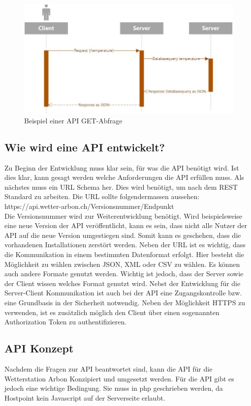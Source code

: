 \begin{figure}[h!]
	\centering
	\includegraphics[width=1\linewidth]{img/Sequenzdiagramm_API}
	\caption{Beispiel einer API GET-Abfrage}
	\label{img:Sequenzdiagramm_API}
\end{figure}


\subsection{Wie wird eine API entwickelt?}
Zu Beginn der Entwicklung muss klar sein, für was die API benötigt wird. Ist dies klar, kann gesagt werden welche Anforderungen die API erfüllen muss. Als nächstes muss ein URL Schema her. Dies wird benötigt, um nach dem REST Standard zu arbeiten. Die URL sollte folgendermassen aussehen: \\ https://api.wetter-arbon.ch/Versionsnummer/Endpunkt\\
Die Versionsnummer wird zur Weiterentwicklung benötigt. Wird beispielsweise eine neue Version der API veröffentlicht, kann es sein, dass nicht alle Nutzer der API auf die neue Version umgestiegen sind. Somit kann es geschehen, dass die vorhandenen Installationen zerstört werden. Neben der URL ist es wichtig, dass die Kommunikation in einem bestimmten Datenformat erfolgt. Hier besteht die Möglichkeit zu wählen zwischen JSON, XML oder CSV zu wählen. Es können auch andere Formate genutzt werden. Wichtig ist jedoch, dass der Server sowie der Client wissen welches Format genutzt wird. Nebst der Entwicklung für die Server-Client Kommunikation ist auch bei der API eine Zugangskontrolle bzw. eine Grundbasis in der Sicherheit notwendig. Neben der Möglichkeit HTTPS zu verwenden, ist es zusätzlich möglich den Client über einen sogenannten Authorization Token zu authentifizieren.\\


\subsection{API Konzept}
Nachdem die Fragen zur API beantwortet sind, kann die API für die Wetterstation Arbon Konzipiert und umgesetzt werden. Für die API gibt es jedoch eine wichtige Bedingung. Sie muss in php geschrieben werden, da Hostpoint kein Javascript auf der Serverseite erlaubt.


